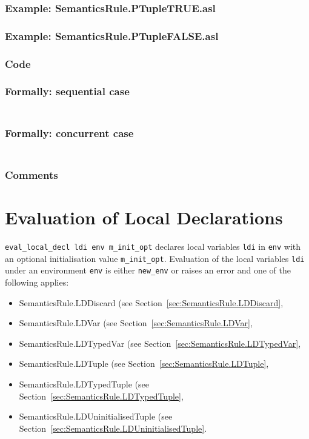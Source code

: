 \documentclass{book}
\begin{document}
    \subsection{Example: SemanticsRule.PTupleTRUE.asl}

    \subsection{Example: SemanticsRule.PTupleFALSE.asl}

  \subsection{Code}

  \subsection{Formally: sequential case}
  \begin{align}
  \end{align} 

  \subsection{Formally: concurrent case}
  \begin{align}
  \end{align} 

    \subsection{Comments}

\chapter{Evaluation of Local Declarations \label{chap:eval_local_decl}}

\texttt{eval\_local\_decl ldi env m\_init\_opt} declares local variables
\texttt{ldi} in \texttt{env} with an optional initialisation value
\texttt{m\_init\_opt}.  Evaluation of the local variables \texttt{ldi}
under an environment \texttt{env} is either \texttt{new\_env} or raises an
error and one of the following applies:
\begin{itemize}
\item SemanticsRule.LDDiscard (see Section~\ref{sec:SemanticsRule.LDDiscard},
\item SemanticsRule.LDVar (see Section~\ref{sec:SemanticsRule.LDVar},
\item SemanticsRule.LDTypedVar (see Section~\ref{sec:SemanticsRule.LDTypedVar},
\item SemanticsRule.LDTuple (see Section~\ref{sec:SemanticsRule.LDTuple},
\item SemanticsRule.LDTypedTuple (see Section~\ref{sec:SemanticsRule.LDTypedTuple},
\item SemanticsRule.LDUninitialisedTuple (see Section~\ref{sec:SemanticsRule.LDUninitialisedTuple}.
\end{itemize}
\end{document}
